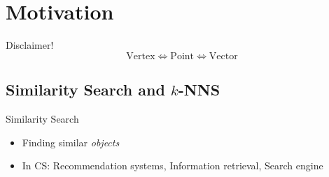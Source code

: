 \section{Motivation}

\begin{frame}{Disclaimer!}
    \[
        \text{Vertex} \iff \text{Point} \iff \text{Vector}
    \]
\end{frame}

\subsection{Similarity Search and \(k\)-NNS}

\begin{frame}{Similarity Search}
    \begin{itemize}
        \item Finding similar \textit{objects}
        \item In CS: Recommendation systems, Information retrieval, Search engine
    \end{itemize}
\end{frame}

